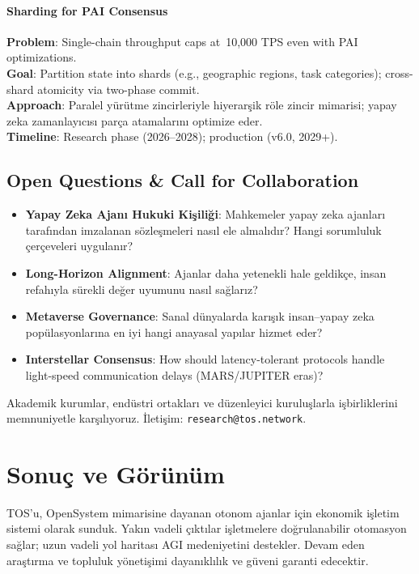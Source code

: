 \documentclass[11pt]{article}
\begin{document}
\begin{itemize}[noitemsep]
\begin{itemize}[noitemsep]
\begin{itemize}[noitemsep]
\begin{itemize}[noitemsep]
\begin{itemize}[noitemsep]
\begin{itemize}[noitemsep]
\begin{itemize}[noitemsep]
\begin{enumerate}[noitemsep]
\begin{itemize}[noitemsep]
\paragraph{Sharding for PAI Consensus}
\textbf{Problem}: Single-chain throughput caps at~10,000 TPS even with PAI optimizations.\\
\textbf{Goal}: Partition state into shards (e.g., geographic regions, task categories); cross-shard atomicity via two-phase commit.\\
\textbf{Approach}: Paralel yürütme zincirleriyle hiyerarşik röle zincir mimarisi; yapay zeka zamanlayıcısı parça atamalarını optimize eder.\\
\textbf{Timeline}: Research phase (2026--2028); production (v6.0, 2029+).

\subsection{Open Questions \& Call for Collaboration}

\begin{itemize}[noitemsep]
  \item \textbf{Yapay Zeka Ajanı Hukuki Kişiliği}: Mahkemeler yapay zeka ajanları tarafından imzalanan sözleşmeleri nasıl ele almalıdır? Hangi sorumluluk çerçeveleri uygulanır?
  \item \textbf{Long-Horizon Alignment}: Ajanlar daha yetenekli hale geldikçe, insan refahıyla sürekli değer uyumunu nasıl sağlarız?
  \item \textbf{Metaverse Governance}: Sanal dünyalarda karışık insan--yapay zeka popülasyonlarına en iyi hangi anayasal yapılar hizmet eder?
  \item \textbf{Interstellar Consensus}: How should latency-tolerant protocols handle light-speed communication delays (MARS/JUPITER eras)?
\end{itemize}

Akademik kurumlar, endüstri ortakları ve düzenleyici kuruluşlarla işbirliklerini memnuniyetle karşılıyoruz. İletişim: \texttt{research@tos.network}.

\section{Sonuç ve Görünüm}
TOS'u, OpenSystem mimarisine dayanan otonom ajanlar için ekonomik işletim sistemi olarak sunduk. Yakın vadeli çıktılar işletmelere doğrulanabilir otomasyon sağlar; uzun vadeli yol haritası AGI medeniyetini destekler. Devam eden araştırma ve topluluk yönetişimi dayanıklılık ve güveni garanti edecektir.


\end{itemize}
\end{enumerate}
\end{itemize}
\end{itemize}
\end{itemize}
\end{itemize}
\end{itemize}
\end{itemize}
\end{itemize}
\end{document}
